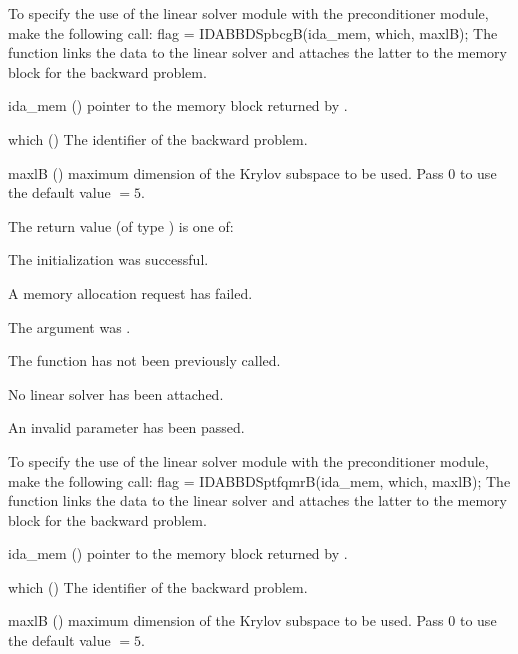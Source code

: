 {}
To specify the use of the {\idaspbcg} linear solver module with the {\idabbdpre} 
preconditioner module, make the following call:
{
  flag = IDABBDSpbcgB(ida\_mem, which, maxlB);
}
{
  The function  links the {\idabbdpre} data to the
  {\idaspbcg} linear solver and attaches the latter to the {\idas}
  memory block for the backward problem.
}
{
  \begin{args}
  \item[ida\_mem] ()
    pointer to the {\idas} memory block returned by .
  \item[which] ()
    The identifier of the backward problem.
  \item[maxlB] ()
    maximum dimension of the Krylov subspace to be used. Pass $0$ to use the 
    default value $=5$.
  \end{args}
}
{
  The return value  (of type ) is one of:
  \begin{args}
  \item[\Id{IDASPILS\_SUCCESS}] 
    The {\idaspgmr} initialization was successful.
  \item[\Id{IDASPILS\_MEM\_FAIL}]
    A memory allocation request has failed.
  \item[\Id{IDASPILS\_MEM\_NULL}]
    The  argument was .
  \item[\Id{IDASPILS\_NO\_ADJ}]
    The function  has not been previously called.
  \item[\Id{IDASPILS\_LMEM\_NULL}]
    No linear solver has been attached.
  \item[\Id{IDASPILS\_ILL\_INPUT}]
    An invalid parameter has been passed.
  \end{args}
}
{}
To specify the use of the {\idasptfqmr} linear solver module with the {\idabbdpre} 
preconditioner module, make the following call:
{
  flag = IDABBDSptfqmrB(ida\_mem, which, maxlB);
}
{
  The function  links the {\idabbdpre} data to the
  {\idasptfqmr} linear solver and attaches the latter to the {\idas}
  memory block for the backward problem.
}
{
  \begin{args}
  \item[ida\_mem] ()
    pointer to the {\idas} memory block returned by .
  \item[which] ()
    The identifier of the backward problem.
  \item[maxlB] ()
    maximum dimension of the Krylov subspace to be used. Pass $0$ to use the 
    default value $=5$.
  \end{args}
}

